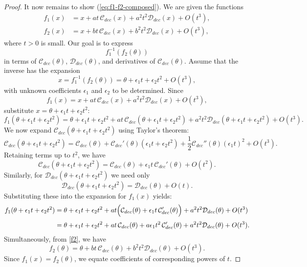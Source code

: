 \documentclass[si.tex]{subfiles}
\begin{document}
\begin{proof}
It now remains to show (\ref{eq:f1-f2-composed}).
We are given the functions
\begin{align}
f_1(x) &= x + at\,\mathcal{C}_{dec}(x) + a^2t^2 \mathcal{D}_{dec}(x) + O(t^3), \label{f1}\\[1mm]
f_2(x) &= x + bt\,\mathcal{C}_{dec}(x) + b^2t^2 \mathcal{D}_{dec}(x) + O(t^3), \label{f2}
\end{align}
where \( t > 0 \) is small. Our goal is to express 
\[
f_1^{-1}(f_2(\theta))
\]
in terms of \( \mathcal{C}_{dec}(\theta) \), \( \mathcal{D}_{dec}(\theta) \), and derivatives of \( \mathcal{C}_{dec}(\theta) \).
Assume that the inverse has the expansion
\[
x = f_1^{-1}(f_2(\theta)) = \theta + \epsilon_1 t + \epsilon_2 t^2 + O(t^3),
\]
with unknown coefficients \(\epsilon_1\) and \(\epsilon_2\) to be determined.
Since
\[
f_1(x) = x + at\,\mathcal{C}_{dec}(x) + a^2t^2\mathcal{D}_{dec}(x) + O(t^3),
\]
substitute \( x = \theta + \epsilon_1t + \epsilon_2t^2 \):
\[
f_1(\theta+\epsilon_1t+\epsilon_2t^2)
=\theta+\epsilon_1t+\epsilon_2t^2 + at\,\mathcal{C}_{dec}(\theta+\epsilon_1t+\epsilon_2t^2) + a^2t^2\mathcal{D}_{dec}(\theta+\epsilon_1t+\epsilon_2t^2) + O(t^3).
\]
We now expand \( \mathcal{C}_{dec}(\theta+\epsilon_1t+\epsilon_2t^2) \) using Taylor's theorem:
\[
\mathcal{C}_{dec}(\theta+\epsilon_1t+\epsilon_2t^2)
= \mathcal{C}_{dec}(\theta) + \mathcal{C}_{dec}'(\theta)(\epsilon_1t+\epsilon_2t^2) + \frac{1}{2}\mathcal{C}_{dec}''(\theta)(\epsilon_1t)^2 + O(t^3).
\]
Retaining terms up to \( t^2 \), we have
\[
\mathcal{C}_{dec}(\theta+\epsilon_1t+\epsilon_2t^2)
= \mathcal{C}_{dec}(\theta) + \epsilon_1t\,\mathcal{C}_{dec}'(\theta) + O(t^2).
\]
Similarly, for \( \mathcal{D}_{dec}(\theta+\epsilon_1t+\epsilon_2t^2) \) we need only
\[
\mathcal{D}_{dec}(\theta+\epsilon_1t+\epsilon_2t^2)
= \mathcal{D}_{dec}(\theta)+O(t).
\]
Substituting these into the expansion for \( f_1(x) \) yields:
\begin{align*}
f_1(\theta+\epsilon_1t+\epsilon_2t^2)
&= \theta+\epsilon_1t+\epsilon_2t^2 + at\Bigl(\mathcal{C}_{dec}(\theta)+\epsilon_1t\,\mathcal{C}_{dec}'(\theta)\Bigr) + a^2t^2\mathcal{D}_{dec}(\theta) + O(t^3)\\[1mm]
&= \theta+\epsilon_1t+\epsilon_2t^2 + at\,\mathcal{C}_{dec}(\theta) + a\epsilon_1t^2\,\mathcal{C}_{dec}'(\theta) + a^2t^2\mathcal{D}_{dec}(\theta) + O(t^3).
\end{align*}
Simultaneously, from \eqref{f2}, we have
\[
f_2(\theta) = \theta + bt\,\mathcal{C}_{dec}(\theta) + b^2t^2\mathcal{D}_{dec}(\theta) + O(t^3).
\]
Since \( f_1(x) = f_2(\theta) \), we equate coefficients of corresponding powers of \( t \).

\end{proof}
\end{document}
